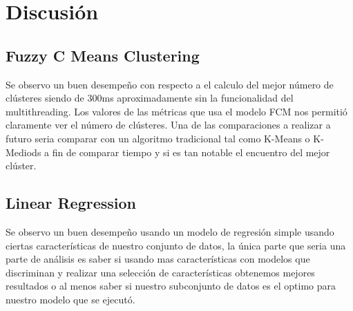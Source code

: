 \documentclass[10pt,journal]{IEEEtran}
\begin{document}
\section{Discusión}

\subsection{Fuzzy C Means Clustering}

Se observo un buen desempeño con respecto a el calculo del mejor número de clústeres siendo de 300ms aproximadamente sin la funcionalidad del multithreading. Los valores de las métricas que usa el modelo FCM nos permitió claramente ver el número de clústeres.  Una de las comparaciones a realizar a futuro seria comparar con un algoritmo tradicional tal como K-Means o K-Mediods a fin de comparar tiempo y si es tan notable el encuentro del mejor clúster.

\subsection{Linear Regression}


Se observo un buen desempeño usando un modelo de regresión simple usando ciertas características de nuestro conjunto de datos, la única parte que seria una parte de análisis es saber si usando mas características con modelos que discriminan y realizar una selección de características obtenemos mejores resultados o al menos saber si nuestro subconjunto de datos es el optimo para nuestro modelo que se ejecutó.
\end{document}

